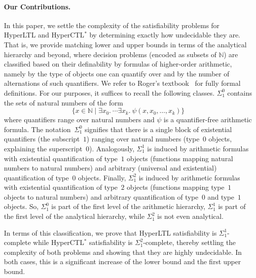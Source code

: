 \documentclass[dvipsnames,10pt,a4paper]{amsart}
\theoremstyle{definition}
\theoremstyle{remark}
\newcommand{\set}[1]{\{#1\}}
\newcommand{\nats}{\mathbb{N}}
\newcommand{\hyltl}{{HyperLTL}\xspace}
\newcommand{\hyctlstar}{{HyperCTL$^*$}\xspace}
\begin{document}
\paragraph{Our Contributions.}
In this paper, we settle the complexity of the satisfiability problems for \hyltl and \hyctlstar
by determining exactly how undecidable they are.
That is, we provide matching lower and upper bounds in terms of the analytical hierarchy and beyond,
where decision problems (encoded as subsets of $\nats$) are classified based on their definability by formulas of higher-order arithmetic, namely by the type of objects one can quantify over and by the number of alternations of such quantifiers.
We refer to Roger's textbook~\cite{Rogers87} for fully formal definitions.
For our purposes, it suffices to recall the following classes.
$\Sigma_1^0$ contains the sets of natural numbers of the form
\[
\set{x \in \nats \mid \exists x_0.\  \cdots \exists x_k.\ \psi(x, x_0, \ldots, x_k)}
\] 
where quantifiers range over natural numbers and $\psi$ is a quantifier-free arithmetic formula.
The notation~$\Sigma_1^0$ signifies that there is a single block of existential quantifiers (the subscript~$1$) ranging over natural numbers (type~$0$ objects, explaining the superscript~$0$).
Analogously, $\Sigma_1^1$ is induced by arithmetic formulas with existential quantification of type~$1$ objects (functions mapping natural numbers to natural numbers) and arbitrary (universal and existential) quantification of type~$0$ objects.
Finally, $\Sigma_1^2$ is induced by arithmetic formulas with existential quantification of type~$2$ objects (functions mapping type~$1$ objects to natural numbers) and arbitrary  quantification of type~$0$ and type~$1$ objects.
So, $\Sigma_1^0$ is part of the first level of the arithmetic hierarchy, $\Sigma_1^1$ is part of the first level of the analytical hierarchy, while $\Sigma_1^2$ is not even analytical.

In terms of this classification, we prove that \hyltl satisfiability is $\Sigma_1^1$-complete while \hyctlstar satisfiability is $\Sigma_1^2$-complete, thereby settling the complexity of both problems and showing that they are highly undecidable.
In both cases, this is a significant increase of the lower bound and the first upper bound.
\end{document}

